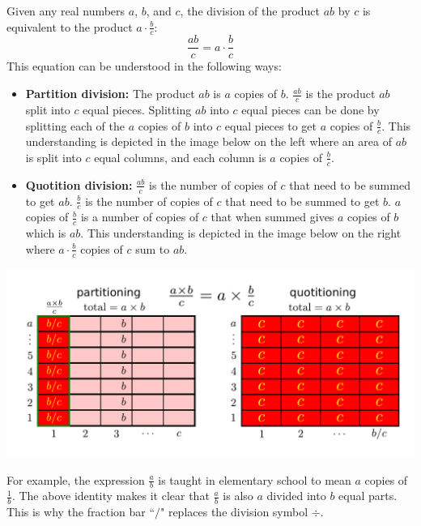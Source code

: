 \documentclass{article}
\begin{document}
Given any real numbers \(a\), \(b\), and \(c\), the division of the product \(ab\) by \(c\) is equivalent to the product \(a \cdot \frac{b}{c}\):
\[\frac{ab}{c} = a \cdot \frac{b}{c}\]
This equation can be understood in the following ways:
\begin{itemize}
\item \textbf{Partition division:} The product \(ab\) is \(a\) copies of \(b\). \(\frac{ab}{c}\) is the product \(ab\) split into \(c\) equal pieces. Splitting \(ab\) into \(c\) equal pieces can be done by splitting each of the \(a\) copies of \(b\) into \(c\) equal pieces to get \(a\) copies of \(\frac{b}{c}\). This understanding is depicted in the image below on the left where an area of \(ab\) is split into \(c\) equal columns, and each column is \(a\) copies of \(\frac{b}{c}\). 
\item \textbf{Quotition division:} \(\frac{ab}{c}\) is the number of copies of \(c\) that need to be summed to get \(ab\). \(\frac{b}{c}\) is the number of copies of \(c\) that need to be summed to get \(b\). \(a\) copies of \(\frac{b}{c}\) is a number of copies of \(c\) that when summed gives \(a\) copies of \(b\) which is \(ab\). This understanding is depicted in the image below on the right where \(a \cdot \frac{b}{c}\) copies of \(c\) sum to \(ab\). 
\end{itemize}
\includegraphics[width = \textwidth]{ab_div_c_equals_a_times_b_div_c}

For example, the expression \(\frac{a}{b}\) is taught in elementary school to mean \(a\) copies of \(\frac{1}{b}\). The above identity makes it clear that \(\frac{a}{b}\) is also \(a\) divided into \(b\) equal parts. This is why the fraction bar ``\(/\)" replaces the division symbol \(\div\).

\vspace{5mm}

\end{document}
